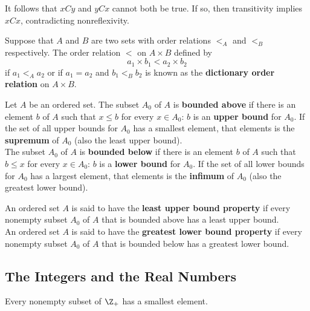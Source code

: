 \begin{remark}
It follows that $xCy$ and $yCx$ cannot both be true. If so, then transitivity implies $xCx$, contradicting nonreflexivity.    
\end{remark}

\begin{eg}
Suppose that $A$ and $B$ are two sets with order relations $<_A$ and $<_B$ respectively. The order relation $<$ on $A \times B$ defined by
\[
    a_1 \times b_1 < a_2 \times b_2
\]
if $a_1 <_A a_2$ or if $a_1 = a_2$ and $b_1 <_B b_2$ is known as the \textbf{dictionary order relation} on $A \times B$.
\end{eg}

\begin{definition}
Let $A$ be an ordered set. The subset $A_0$ of $A$ is \textbf{bounded above} if there is an element $b$ of $A$ such that $x \leq b$ for every $x \in A_0$: 
$b$ is an \textbf{upper bound} for $A_0$. If the set of all upper bounds for $A_0$ has a smallest element, that elements is the \textbf{supremum} of $A_0$ (also the least upper bound). \\

The subset $A_0$ of $A$ is \textbf{bounded below} if there is an element $b$ of $A$ such that $b \leq x$ for every $x \in A_0$: 
$b$ is a \textbf{lower bound} for $A_0$. If the set of all lower bounds for $A_0$ has a largest element, that elements is the \textbf{infimum} of $A_0$ (also the greatest lower bound). \\
\end{definition}

\begin{definition}
An ordered set $A$ is said to have the \textbf{least upper bound property} if every nonempty subset $A_0$ of $A$ that is bounded above has a least upper bound. \\

An ordered set $A$ is said to have the \textbf{greatest lower bound property} if every nonempty subset $A_0$ of $A$ that is bounded below has a greatest lower bound.
\end{definition}

\subsection{The Integers and the Real Numbers}
\begin{theorem}
Every nonempty subset of $\Z_+$ has a smallest element.
\end{theorem}

